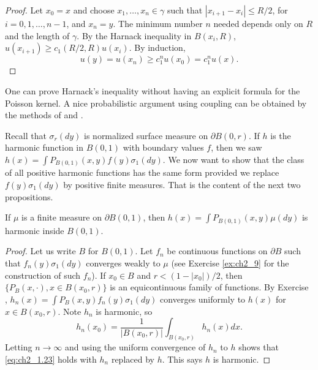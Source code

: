 \mpagebreak

\begin{proof}
Let $x_0 = x$ and choose $x_1,\ldots,x_n \in \gamma$ such that $|x_{i+1}-x_i| \leq R/2$, for $i = 0,1,\ldots,n-1$, and $x_n = y$. The minimum number $n$ needed depends only on $R$ and the length of $\gamma$. By the Harnack inequality in $B(x_i,R)$, $u(x_{i+1}) \geq c_1(R/2,R)u(x_i)$. By induction,
\[
    u(y) = u(x_n) \geq c_1^nu(x_0) = c_1^nu(x).
\]
\end{proof}

One can prove Harnack's inequality without having an explicit formula for the Poisson kernel. A nice probabilistic argument using coupling can be obtained by the methods of \cite{LindvallRogers1986} and \cite{Cranston1992}.



Recall that $\sigma_r(dy)$ is normalized surface measure on $\partial B(0,r)$. If $h$ is the harmonic function in $B(0,1)$ with boundary values $f$, then we saw $h(x) = \int P_{B(0,1)}(x,y)f(y)\sigma_1(dy)$. We now want to show that the class of all positive harmonic functions has the same form provided we replace $f(y)\sigma_1(dy)$ by positive finite measures. That is the content of the next two propositions.

\begin{proposition}\label{prop:ch2_1.21}
If $\mu$ is a finite measure on $\partial B(0,1)$, then $h(x) = \int P_{B(0,1)}(x,y)\mu(dy)$ is harmonic inside $B(0,1)$.
\end{proposition}

\begin{proof}
Let us write $B$ for $B(0,1)$. Let $f_n$ be continuous functions on $\partial B$ such that $f_n(y)\sigma_1(dy)$ converges weakly to $\mu$ (see Exercise \ref{ex:ch2_9} for the construction of such $f_n$). If $x_0 \in B$ and $r < (1-|x_0|)/2$, then $\{P_B(x,\cdot), x \in B(x_0,r)\}$ is an equicontinuous family of functions. By Exercise , $h_n(x) = \int P_B(x,y)f_n(y)\sigma_1(dy)$ converges uniformly to $h(x)$ for $x \in B(x_0,r)$. Note $h_n$ is harmonic, so
\begin{equation}\label{eq:ch2_1.23}
    h_n(x_0) = \frac{1}{|B(x_0,r)|} \int_{B(x_0,r)} h_n(x)dx.
\end{equation}
Letting $n \to \infty$ and using the uniform convergence of $h_n$ to $h$ shows that \eqref{eq:ch2_1.23} holds with $h_n$ replaced by $h$. This says $h$ is harmonic.
\end{proof}

